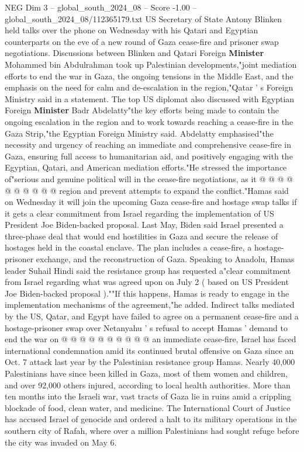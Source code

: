 \begin{textsample}{NEG Dim 3 – global\_south\_2024\_08 – Score -1.00 – global\_south\_2024\_08/112365179.txt}  \label{ex:f3_neg_154}
US Secretary of State Antony Blinken held talks over the phone on Wednesday with his Qatari and Egyptian counterparts on the eve of a new round of Gaza cease-fire and prisoner swap negotiations.
Discussions between Blinken and Qatari Foreign \textbf{Minister} Mohammed bin Abdulrahman took up Palestinian developments,"joint mediation efforts to end the war in Gaza, the ongoing tensions in the Middle East, and the emphasis on the need for calm and de-escalation in the region,"Qatar ' s Foreign Ministry said in a statement.
The top US diplomat also discussed with Egyptian Foreign \textbf{Minister} Badr Abdelatty"the key efforts being made to contain the ongoing escalation in the region and to work towards reaching a cease-fire in the Gaza Strip,"the Egyptian Foreign Ministry said.
Abdelatty emphasised"the necessity and urgency of reaching an immediate and comprehensive cease-fire in Gaza, ensuring full access to humanitarian aid, and positively engaging with the Egyptian, Qatari, and American mediation efforts."He stressed the importance of"serious and genuine political will in the cease-fire negotiations, as it @ @ @ @ @ @ @ @ @ @ region and prevent attempts to expand the conflict."Hamas said on Wednesday it will join the upcoming Gaza cease-fire and hostage swap talks if it gets a clear commitment from Israel regarding the implementation of US President Joe Biden-backed proposal.
Last May, Biden said Israel presented a three-phase deal that would end hostilities in Gaza and secure the release of hostages held in the coastal enclave.
The plan includes a cease-fire, a hostage-prisoner exchange, and the reconstruction of Gaza.
Speaking to Anadolu, Hamas leader Suhail Hindi said the resistance group has requested a"clear commitment from Israel regarding what was agreed upon on July 2 ( based on US President Joe Biden-backed proposal ).""If this happens, Hamas is ready to engage in the implementation mechanisms of the agreement,"he added.
Indirect talks mediated by the US, Qatar, and Egypt have failed to agree on a permanent cease-fire and a hostage-prisoner swap over Netanyahu ' s refusal to accept Hamas ' demand to end the war on @ @ @ @ @ @ @ @ @ @ an immediate cease-fire, Israel has faced international condemnation amid its continued brutal offensive on Gaza since an Oct. 7 attack last year by the Palestinian resistance group Hamas.
Nearly 40,000 Palestinians have since been killed in Gaza, most of them women and children, and over 92,000 others injured, according to local health authorities.
More than ten months into the Israeli war, vast tracts of Gaza lie in ruins amid a crippling blockade of food, clean water, and medicine.
The International Court of Justice has accused Israel of genocide and ordered a halt to its military operations in the southern city of Rafah, where over a million Palestinians had sought refuge before the city was invaded on May 6.

\end{textsample}
